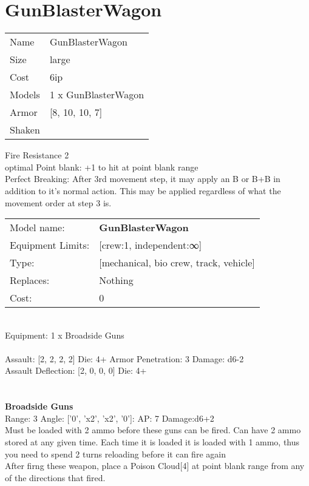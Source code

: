 \pagebreak\pagebreak

\section{ GunBlasterWagon }

\begin{tabular}{ll}
  Name & GunBlasterWagon \\
  Size & large\\
  Cost & 6ip\\
  Models & 1 x GunBlasterWagon\\
  Armor & [8, 10, 10, 7]\\
  Shaken & \\
\end{tabular}

\noindent Fire Resistance 2\\ 
optimal Point blank: +1 to hit at point blank range\\ 
Perfect Breaking: After 3rd movement step, it may apply an B or B+B in addition to it's normal action. This may be applied regardless of what the movement order at step 3 is.\\ 


\noindent
\begin{tabular}{ll}
Model name: &{\bf GunBlasterWagon } \\
Equipment Limits: &[crew:1, independent:∞] \\
Type: &[mechanical, bio crew, track, vehicle] \\
Replaces: &Nothing \\
Cost: & 0\\
\end{tabular}
\ \\
Equipment: 1 x Broadside Guns \\
\ \\
Assault: [2, 2, 2, 2] Die: 4+ Armor Penetration: 3 Damage: d6-2 \\
Assault Deflection: [2, 0, 0, 0] Die: 4+\\
\indent  
\ \\

\ \\
{\bf Broadside Guns } \\



Range: 3  Angle: ['0', 'x2', 'x2', '0']: AP: 7 Damage:d6+2 \\
Must be loaded with 2 ammo before these guns can be fired. Can have 2 ammo stored at any given time. Each time it is loaded it is loaded with 1 ammo, thus you need to spend 2 turns reloading before it can fire again\\ 
After firng these weapon, place a Poison Cloud[4] at point blank range from any of the directions that fired.\\ 




